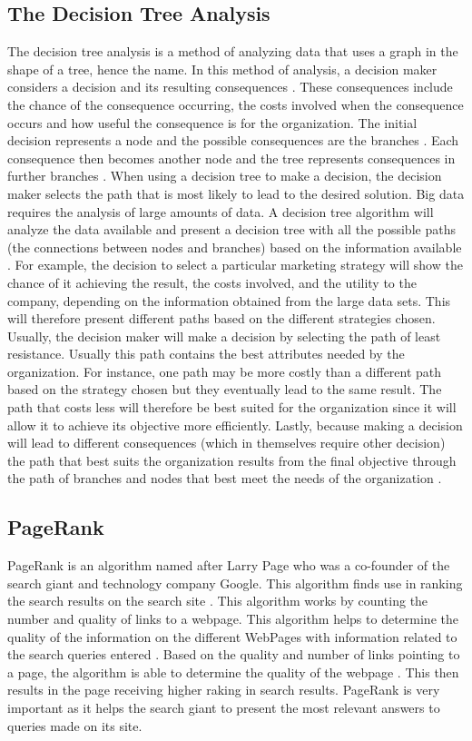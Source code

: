 \documentclass[sigconf]{acmart}
\begin{document}
\subsection{The Decision Tree Analysis}
The decision tree analysis is a method of analyzing data that uses a graph in the shape of a tree, hence the name. In this method of analysis, a decision maker considers a decision and its resulting consequences \cite{Zhang2015}. These consequences include the chance of the consequence occurring, the costs involved when the consequence occurs and how useful the consequence is for the organization. The initial decision represents a node and the possible consequences are the branches \cite{Guller2015}. Each consequence then becomes another node and the tree represents consequences in further branches \cite{Guller2015}. When using a decision tree to make a decision, the decision maker selects the path that is most likely to lead to the desired solution. Big data requires the analysis of large amounts of data. A decision tree algorithm will analyze the data available and present a decision tree with all the possible paths (the connections between nodes and branches) based on the information available \cite{Guller2015}. 
For example, the decision to select a particular marketing strategy will show the chance of it achieving the result, the costs involved, and the utility to the company, depending on the information obtained from the large data sets. This will therefore present different paths based on the different strategies chosen. Usually, the decision maker will make a decision by selecting the path of least resistance. Usually this path contains the best attributes needed by the organization. For instance, one path may be more costly than a different path based on the strategy chosen but they eventually lead to the same result. The path that costs less will therefore be best suited for the organization since it will allow it to achieve its objective more efficiently. Lastly, because making a decision will lead to different consequences (which in themselves require other decision) the path that best suits the organization results from the final objective through the path of branches and nodes that best meet the needs of the organization \cite{Guller2015}.

\subsection{PageRank}
PageRank is an algorithm named after Larry Page who was a co-founder of the search giant and technology company Google. This algorithm finds use in ranking the search results on the search site \cite{Zomaya2017}. This algorithm works by counting the number and quality of links to a webpage. This algorithm helps to determine the quality of the information on the different WebPages with information related to the search queries entered \cite{Langville2006}. Based on the quality and number of links pointing to a page, the algorithm is able to determine the quality of the webpage \cite{Zomaya2017}. This then results in the page receiving higher raking in search results. PageRank is very important as it helps the search giant to present the most relevant answers to queries made on its site. 
\end{document}

